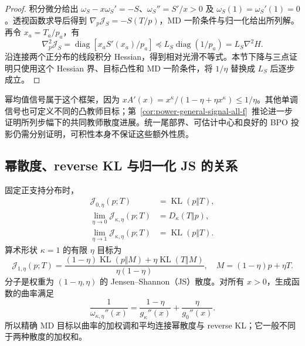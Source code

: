 \documentclass[lang=cn,scheme=chinese,openany]{../book/elegantbook}
\newcommand{\KL}{\operatorname{KL}}
\begin{document}
\begin{proof}
积分微分给出 $\omega_S-x\omega_S'=-S$、$\omega_S''=S'/x>0$ 及 $\omega_S(1)=\omega_S'(1)=0$。透视函数求导后得到 $\nabla_p\mathcal J_S=-S(T/p)$，MD 一阶条件与归一化给出所列解。再令 $x_a=T_a/p_a$，有
\begin{equation}
 \nabla_p^2\mathcal J_S
 =\operatorname{diag}[x_aS'(x_a)/p_a]
 \preceq L_S\operatorname{diag}(1/p_a)=L_S\nabla^2H.
\end{equation}
沿连接两个正分布的线段积分 Hessian，得到相对光滑不等式。本节下降与三点证明只使用这个 Hessian 界、目标凸性和 MD 一阶条件，将 $1/\eta$ 替换成 $L_S$ 后逐步成立。
\end{proof}

幂均值信号属于这个框架，因为 $xA'(x)=x^\kappa/(1-\eta+\eta x^\kappa)\le1/\eta$。其他单调信号也可定义不同的凸教师目标；第~\ref{cor:power-general-signal-all-f}~推论进一步证明所列步幅下的共同教师散度进展。统一尾部界、可估计中心和良好的 BPO 投影仍需分别证明，可积性本身不保证这些额外性质。

\subsection{幂散度、reverse KL 与归一化 JS 的关系}

\begin{theorem}[精确 MD 目标的端点与曲率插值]
\label{thm:power-md-objective-endpoints}
固定正支持分布时，
\begin{align}
 \mathcal J_{0,\eta}(p;T)&=\KL(p\Vert T),\\
 \lim_{\eta\to0}\mathcal J_{\kappa,\eta}(p;T)&=D_\kappa(T\Vert p),\\
 \lim_{\eta\to1}\mathcal J_{\kappa,\eta}(p;T)&=\KL(p\Vert T).
 \label{eq:power-md-objective-limits}
\end{align}
算术形状 $\kappa=1$ 的有限 $\eta$ 目标为
\begin{equation}
 \boxed{\mathcal J_{1,\eta}(p;T)
 =\frac{(1-\eta)\KL(p\Vert M)+\eta\KL(T\Vert M)}{\eta(1-\eta)},
 \quad M=(1-\eta)p+\eta T.}
 \label{eq:power-md-js-endpoint}
\end{equation}
分子是权重为 $(1-\eta,\eta)$ 的 Jensen--Shannon（JS）散度。对所有 $x>0$，生成函数的曲率满足
\begin{equation}
 \frac1{\omega_{\kappa,\eta}''(x)}
 =\frac{1-\eta}{g_\kappa''(x)}+\frac\eta{g_0''(x)}.
 \label{eq:power-md-harmonic-curvature}
\end{equation}
所以精确 MD 目标以曲率的加权调和平均连接幂散度与 reverse KL；它一般不同于两种散度的加权和。
\end{theorem}
\end{document}
